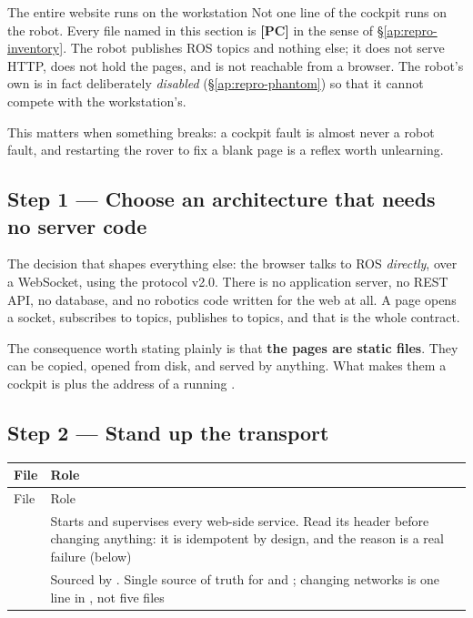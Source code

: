\begin{trapbox}{The entire website runs on the workstation}
Not one line of the cockpit runs on the robot. Every file named in this
section is \textbf{[PC]} in the sense of \S\ref{ap:repro-inventory}. The robot
publishes ROS topics and nothing else; it does not serve HTTP, does not hold
the pages, and is not reachable from a browser. The robot's own
 is in fact deliberately \emph{disabled}
(\S\ref{ap:repro-phantom}) so that it cannot compete with the
workstation's.

This matters when something breaks: a cockpit fault is almost never a robot
fault, and restarting the rover to fix a blank page is a reflex worth
unlearning.
\end{trapbox}

\subsection{Step 1 --- Choose an architecture that needs no server code}
\label{ap:repro-web-arch}

The decision that shapes everything else: the browser talks to ROS
\emph{directly}, over a WebSocket, using the  protocol v2.0.
There is no application server, no REST API, no database, and no
robotics code written for the web at all. A page opens a socket, subscribes to
topics, publishes to topics, and that is the whole contract.

The consequence worth stating plainly is that \textbf{the pages are static
files}. They can be copied, opened from disk, and served by anything. What
makes them a cockpit is  plus the address of a
running .

\subsection{Step 2 --- Stand up the transport}
\label{ap:repro-web-transport}

\begin{longtable}{@{}L{5.3cm}L{8.3cm}@{}}
\toprule
File & Role \\
\midrule
\endfirsthead
\toprule
File & Role \\
\midrule
\endhead
{} &
  Starts and supervises every web-side service. Read its header before
  changing anything: it is idempotent by design, and the reason is a real
  failure (below) \\
\addlinespace
{} &
  Sourced by . Single source of truth for
   and ; changing networks is one line in
  , not five files \\
\bottomrule
\end{longtable}

